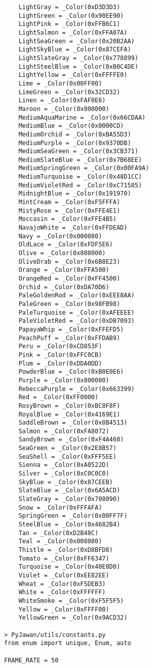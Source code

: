 \documentclass[11pt]{article}
\begin{document}
\begin{lstlisting}
    LightGray = _Color(0xD3D3D3)
    LightGreen = _Color(0x90EE90)
    LightPink = _Color(0xFFB6C1)
    LightSalmon = _Color(0xFFA07A)
    LightSeaGreen = _Color(0x20B2AA)
    LightSkyBlue = _Color(0x87CEFA)
    LightSlateGray = _Color(0x778899)
    LightSteelBlue = _Color(0xB0C4DE)
    LightYellow = _Color(0xFFFFE0)
    Lime = _Color(0x00FF00)
    LimeGreen = _Color(0x32CD32)
    Linen = _Color(0xFAF0E6)
    Maroon = _Color(0x800000)
    MediumAquaMarine = _Color(0x66CDAA)
    MediumBlue = _Color(0x0000CD)
    MediumOrchid = _Color(0xBA55D3)
    MediumPurple = _Color(0x9370DB)
    MediumSeaGreen = _Color(0x3CB371)
    MediumSlateBlue = _Color(0x7B68EE)
    MediumSpringGreen = _Color(0x00FA9A)
    MediumTurquoise = _Color(0x48D1CC)
    MediumVioletRed = _Color(0xC71585)
    MidnightBlue = _Color(0x191970)
    MintCream = _Color(0xF5FFFA)
    MistyRose = _Color(0xFFE4E1)
    Moccasin = _Color(0xFFE4B5)
    NavajoWhite = _Color(0xFFDEAD)
    Navy = _Color(0x000080)
    OldLace = _Color(0xFDF5E6)
    Olive = _Color(0x808000)
    OliveDrab = _Color(0x6B8E23)
    Orange = _Color(0xFFA500)
    OrangeRed = _Color(0xFF4500)
    Orchid = _Color(0xDA70D6)
    PaleGoldenRod = _Color(0xEEE8AA)
    PaleGreen = _Color(0x98FB98)
    PaleTurquoise = _Color(0xAFEEEE)
    PaleVioletRed = _Color(0xDB7093)
    PapayaWhip = _Color(0xFFEFD5)
    PeachPuff = _Color(0xFFDAB9)
    Peru = _Color(0xCD853F)
    Pink = _Color(0xFFC0CB)
    Plum = _Color(0xDDA0DD)
    PowderBlue = _Color(0xB0E0E6)
    Purple = _Color(0x800080)
    RebeccaPurple = _Color(0x663399)
    Red = _Color(0xFF0000)
    RosyBrown = _Color(0xBC8F8F)
    RoyalBlue = _Color(0x4169E1)
    SaddleBrown = _Color(0x8B4513)
    Salmon = _Color(0xFA8072)
    SandyBrown = _Color(0xF4A460)
    SeaGreen = _Color(0x2E8B57)
    SeaShell = _Color(0xFFF5EE)
    Sienna = _Color(0xA0522D)
    Silver = _Color(0xC0C0C0)
    SkyBlue = _Color(0x87CEEB)
    SlateBlue = _Color(0x6A5ACD)
    SlateGray = _Color(0x708090)
    Snow = _Color(0xFFFAFA)
    SpringGreen = _Color(0x00FF7F)
    SteelBlue = _Color(0x4682B4)
    Tan = _Color(0xD2B48C)
    Teal = _Color(0x008080)
    Thistle = _Color(0xD8BFD8)
    Tomato = _Color(0xFF6347)
    Turquoise = _Color(0x40E0D0)
    Violet = _Color(0xEE82EE)
    Wheat = _Color(0xF5DEB3)
    White = _Color(0xFFFFFF)
    WhiteSmoke = _Color(0xF5F5F5)
    Yellow = _Color(0xFFFF00)
    YellowGreen = _Color(0x9ACD32)

> PyJawan/utils/constants.py
from enum import unique, Enum, auto

FRAME_RATE = 50



\end{lstlisting}
\end{document}
